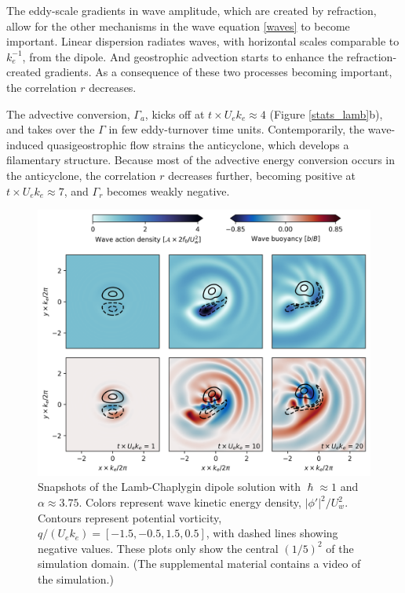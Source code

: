 \documentclass{jfm}
\begin{document}
The eddy-scale gradients in wave amplitude, which are created by refraction,
 allow for the other mechanisms in the wave equation \eqref{waves} to become
 important. Linear dispersion radiates waves, with horizontal scales comparable
 to $k_e^{-1}$, from the dipole. And geostrophic advection starts to enhance
 the refraction-created gradients. As a consequence of these two processes becoming
 important, the correlation $r$ decreases.

The advective conversion, $\Gamma_a$, kicks
off at $t\times U_e k_e \approx 4$ (Figure \ref{stats_lamb}b), and takes over
the $\Gamma$ in few eddy-turnover time units. Contemporarily, the wave-induced
quasigeostrophic flow strains the anticyclone, which develops a filamentary structure.
Because most of the advective energy conversion occurs in the anticyclone, the
correlation $r$ decreases further, becoming positive at $t\times U_e k_e \approx 7$,
and $\Gamma_r$ becomes weakly negative.


\begin{figure}
\label{snaps_lamb}
\centering
\includegraphics[width=.925\textwidth]{figs/fig1.png}
\caption{Snapshots of the Lamb-Chaplygin dipole solution with $\hslash \approx 1$
        and $\alpha \approx 3.75$. Colors represent wave kinetic energy density,
         $|\phi'|^2/U_w^2$.
        Contours represent potential vorticity, $q / (U_e k_e) = [
        -1.5,-0.5,1.5,0.5]$, with dashed lines showing negative values.
        These plots only show the central $(1/5)^2$
        of the simulation domain. (The supplemental material contains a video
        of the simulation.)}
\end{figure}
\end{document}
